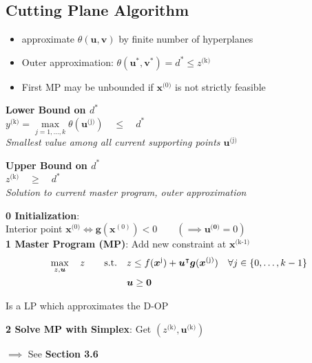 \documentclass[english]{latex4ei/latex4ei_sheet}
\begin{document}
\begin{sectionbox}
	\subsection{Cutting Plane Algorithm}
	\begin{itemize}
		\item approximate $\theta(\bm{u}, \bm{v})$ by finite number of hyperplanes
		\item Outer approximation: $\theta(\bm{u}^*, \bm{v}^*) = d^* \leq z^{\text{(k)}}$
		\item First MP may be unbounded if $\bm{x}^{\text{(0)}}$ is not strictly feasible
	\end{itemize}
	\begin{emphbox}
		\textbf{Lower Bound on $d^*$} \\
		\vspace{0.3em}
		$y^{\text{(k)}} = \max\limits_{j=1,\dots,k} \theta(\bm{u}^{\text{(j)}}) \quad \leq \quad d^*$ \\
		\textit{Smallest value among all current supporting points $\bm{u}^{\text{(j)}}$}
	\end{emphbox}
	\begin{emphbox}
		\textbf{Upper Bound on $d^*$} \\
		\vspace{0.3em}
		$z^{\text{(k)}} \quad \geq \quad d^*$ \\
		\textit{Solution to current master program, outer approximation}
	\end{emphbox}

	\textbf{ 0 Initialization}: \\
	 Interior point $\bm{x}^{\text{(0)}} \iff \bm{g}(\bm{x}^{(0)}) < 0 \qquad (\implies \bm{u^{\text{(0)}}} = 0)$
	\\
	
	\textbf{ 1 Master Program (MP)}: Add new constraint at $\bm{x}^{\text{(k-1)}}$
	\begin{align}
		\max\limits_{z, \bm{u}} \quad z \qquad \text{s.t.} \quad & z \leq f(\bm{x}^{\text{j}}) + \bm{u}^\intercal\bm{g}(\bm{x}^{\text{(j)}}) \quad \forall j \in \{0, \dots, k-1\} \notag\\
		& \bm{u} \geq \bm{0} \notag
	\end{align}
	\begin{center}
		Is a LP which approximates the D-OP
	\end{center}
	\vspace{0.5em}
	\textbf{ 2 Solve MP with Simplex}: Get $(z^{\text{(k)}}, \bm{u}^{\text{(k)}})$
	\begin{center}
		$\implies$ See \textbf{Section 3.6}
	\end{center}


\end{sectionbox}
\end{document}
